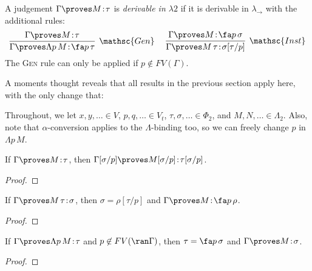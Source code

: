 \documentclass[reqno]{amsart}
\begin{document}
    \begin{definition}
        A judgement $\Gamma\proves M\!:\!\tau$ is \textit{derivable in $\lambda2$} if it is derivable in $\lambda_\rightarrow$ with the additional rules:
        \begin{equation*}
            \infer[\mathsc{Gen}]{\Gamma\proves\Lambda p\,M\!:\!\fa p\,\tau}{\Gamma\proves M\!:\!\tau}\ \ \ \ 
            \infer[\mathsc{Inst}]{\Gamma\proves M\,\tau\!:\!\sigma[\tau/p]}{\Gamma\proves M\!:\!\fa p\,\sigma}
        \end{equation*}
        The \textsc{Gen} rule can only be applied if $p\not\in FV(\Gamma)$.
    \end{definition}

    A moments thought reveals that all results in the previous section apply here, with the only change that:

    \begin{notation}
        Throughout, we let $x,y,\ldots\in V$, $p,q,\ldots\in V_t$, $\tau,\sigma,\ldots\in\Phi_2$, and $M,N,\ldots\in\Lambda_2$. Also, note that $\alpha$-conversion applies to the $\Lambda$-binding too, so we can freely change $p$ in $\Lambda p\,M$.
    \end{notation}

    \begin{lemma}\label{lem:polymorphic_variable_substitution}
        If $\Gamma\proves M\!:\!\tau$, then $\Gamma[\sigma/p]\proves M[\sigma/p]\!:\!\tau[\sigma/p]$.
    \end{lemma}
    \begin{proof}
        \TODO
    \end{proof}

    \begin{lemma}\label{lem:polymorphic_generation_1}
        If $\Gamma\proves M\,\tau\!:\!\sigma$, then $\sigma=\rho[\tau/p]$ and $\Gamma\proves M\!:\!\fa p\,\rho$.
    \end{lemma}
    \begin{proof}
        \TODO
    \end{proof}

    \begin{lemma}\label{lem:polymorphic_generation_2}
        If $\Gamma\proves\Lambda p\,M\!:\!\tau$ and $p\not\in FV(\ran\Gamma)$, then $\tau=\fa p\,\sigma$ and $\Gamma\proves M\!:\!\sigma$.
    \end{lemma}
    \begin{proof}
        \TODO
    \end{proof}
\end{document}
